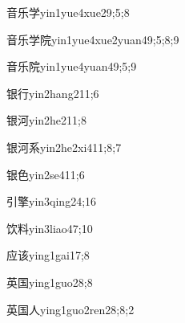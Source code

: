 \begin{verbete}{音乐学}{yin1yue4xue2}{9;5;8}
\end{verbete}

\begin{verbete}{音乐学院}{yin1yue4xue2yuan4}{9;5;8;9}
\end{verbete}

\begin{verbete}{音乐院}{yin1yue4yuan4}{9;5;9}
\end{verbete}

\begin{verbete}{银行}{yin2hang2}{11;6}
\end{verbete}

\begin{verbete}{银河}{yin2he2}{11;8}
\end{verbete}

\begin{verbete}{银河系}{yin2he2xi4}{11;8;7}
\end{verbete}

\begin{verbete}{银色}{yin2se4}{11;6}
\end{verbete}

\begin{verbete}{引擎}{yin3qing2}{4;16}
\end{verbete}

\begin{verbete}{饮料}{yin3liao4}{7;10}
\end{verbete}

\begin{verbete}{应该}{ying1gai1}{7;8}
\end{verbete}

\begin{verbete}{英国}{ying1guo2}{8;8}
\end{verbete}

\begin{verbete}{英国人}{ying1guo2ren2}{8;8;2}
\end{verbete}

